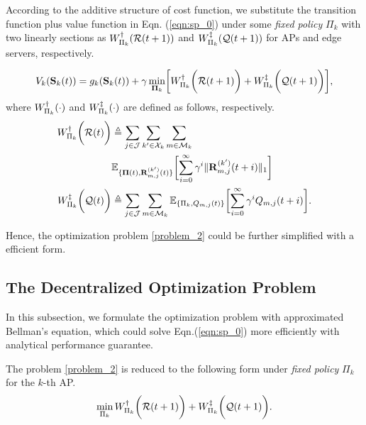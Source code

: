 According to the additive structure of cost function, we substitute the transition function plus value function in Eqn. (\ref{eqn:sp_0}) under some \emph{fixed policy} $\Pi_{k}$ with two linearly sections as $W^{\dagger}_{\Pi_{k}}(\mathcal{R}(t+1))$ and $W^{\ddagger}_{\Pi_{k}}(\mathcal{Q}(t+1))$ for APs and edge servers, respectively.
\begin{definition}
    \begin{align}
        V_{k}(\Stat_{k}(t)) = g_{k}(\Stat_{k}(t)) + \gamma \min_{\Baseline_{k}} \Bracket{
            W^{\AP}_{\Pi_{k}}\Paren{\mathcal{R}(t+1)} + W^{\ES}_{\Pi_{k}}\Paren{\mathcal{Q}(t+1)}
        },
    \end{align}
    where $W^{\dagger}_{\Pi_{k}}(\cdot)$ and $W^{\ddagger}_{\Pi_{k}}(\cdot)$ are defined as follows, respectively.
    \begin{align}
        W^{\AP}_{\Pi_{k}}\Paren{\mathcal{R}(t)}
            &\define \sum_{j\in\jSpace}\sum_{k'\in\ccSet_{k}}\sum_{m\in\esSet_{k}}
            \nonumber\\
            &\mathbb{E}_{\{\Baseline(t), \vec{R}^{(k')}_{m,j}(t)\}}\Bracket{
                \sum_{i=0}^{\infty} \gamma^{i} \Inorm{\vec{R}^{(k')}_{m,j}({t+i})}
            }
        \\
        W^{\ES}_{\Pi_{k}}\Paren{\mathcal{Q}(t)}
            &\define \sum_{j\in\jSpace}\sum_{m\in\esSet_{k}}
            \mathbb{E}_{\{\Pi_{k}, Q_{m,j}(t)\}}\Bracket{
                \sum_{i=0}^{\infty} \gamma^{i} Q_{m,j}({t+i})
            }.
    \end{align}
\end{definition}
Hence, the optimization problem \ref{problem_2} could be further simplified with a efficient form.

\subsection{The Decentralized Optimization Problem}
In this subsection, we formulate the optimization problem with approximated Bellman's equation, which could solve Eqn.(\ref{eqn:sp_0}) more efficiently with analytical performance guarantee.
\begin{problem}
    The problem \ref{problem_2} is reduced to the following form under \emph{fixed policy} $\Pi_{k}$ for the $k$-th AP.
    \begin{align}
        \min_{\Pi_{k}} W^{\dagger}_{\Pi_{k}}\bigg(\mathcal{R}(t+1)\bigg) + W^{\ddagger}_{\Pi_{k}}\bigg(\mathcal{Q}(t+1)\bigg).
        \label{eqn:partial}
    \end{align}
\end{problem}

